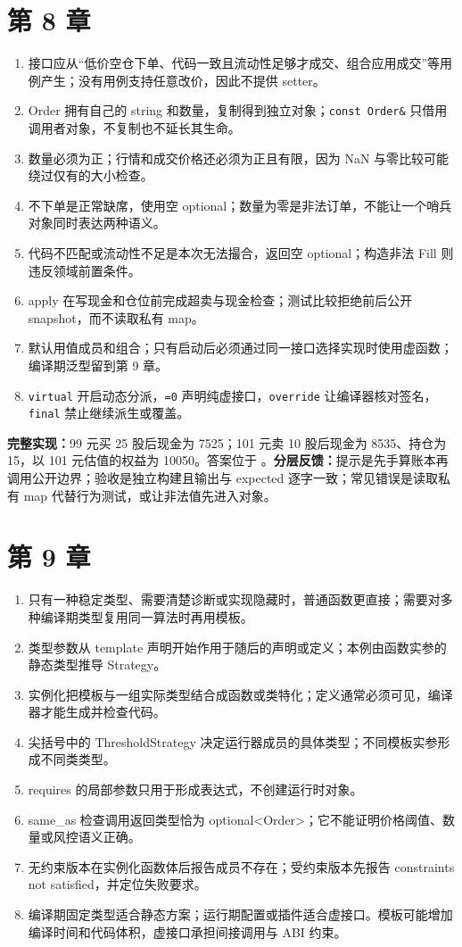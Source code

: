 \section{第 8 章}
\begin{enumerate}
  \item 接口应从“低价空仓下单、代码一致且流动性足够才成交、组合应用成交”等用例产生；没有用例支持任意改价，因此不提供 setter。
  \item Order 拥有自己的 string 和数量，复制得到独立对象；\texttt{const Order\&} 只借用调用者对象，不复制也不延长其生命。
  \item 数量必须为正；行情和成交价格还必须为正且有限，因为 NaN 与零比较可能绕过仅有的大小检查。
  \item 不下单是正常缺席，使用空 optional；数量为零是非法订单，不能让一个哨兵对象同时表达两种语义。
  \item 代码不匹配或流动性不足是本次无法撮合，返回空 optional；构造非法 Fill 则违反领域前置条件。
  \item apply 在写现金和仓位前完成超卖与现金检查；测试比较拒绝前后公开 snapshot，而不读取私有 map。
  \item 默认用值成员和组合；只有启动后必须通过同一接口选择实现时使用虚函数；编译期泛型留到第 9 章。
  \item \texttt{virtual} 开启动态分派，\texttt{=0} 声明纯虚接口，\texttt{override} 让编译器核对签名，\texttt{final} 禁止继续派生或覆盖。
\end{enumerate}

\noindent\textbf{完整实现：}99 元买 25 股后现金为 7525；101 元卖 10 股后现金为 8535、持仓为 15，以 101 元估值的权益为 10050。答案位于 。\textbf{分层反馈：}提示是先手算账本再调用公开边界；验收是独立构建且输出与 expected 逐字一致；常见错误是读取私有 map 代替行为测试，或让非法值先进入对象。

\section{第 9 章}
\begin{enumerate}
  \item 只有一种稳定类型、需要清楚诊断或实现隐藏时，普通函数更直接；需要对多种编译期类型复用同一算法时再用模板。
  \item 类型参数从 template 声明开始作用于随后的声明或定义；本例由函数实参的静态类型推导 Strategy。
  \item 实例化把模板与一组实际类型结合成函数或类特化；定义通常必须可见，编译器才能生成并检查代码。
  \item 尖括号中的 ThresholdStrategy 决定运行器成员的具体类型；不同模板实参形成不同类类型。
  \item requires 的局部参数只用于形成表达式，不创建运行时对象。
  \item same\_as 检查调用返回类型恰为 optional<Order>；它不能证明价格阈值、数量或风控语义正确。
  \item 无约束版本在实例化函数体后报告成员不存在；受约束版本先报告 constraints not satisfied，并定位失败要求。
  \item 编译期固定类型适合静态方案；运行期配置或插件适合虚接口。模板可能增加编译时间和代码体积，虚接口承担间接调用与 ABI 约束。
\end{enumerate}


